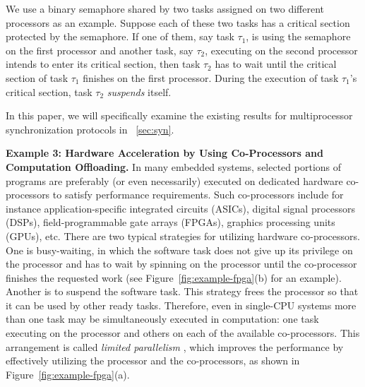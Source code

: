 We use a binary semaphore shared by two tasks assigned on two different processors as an example. Suppose each of these two tasks has a critical section protected by the semaphore. If one of them, say task $\tau_1$, is using the semaphore on the first processor and another task, say $\tau_2$, executing on the second processor intends to enter its critical section, then task $\tau_2$ has to wait until the critical section of task $\tau_1$ finishes on the first processor. During the execution of task $\tau_1$'s critical section, task $\tau_2$ \emph{suspends} itself. 


In this paper, we will specifically examine the existing results for multiprocessor synchronization protocols in \mysectionref{}~\ref{sec:syn}. %

{\bf Example 3: Hardware Acceleration by Using Co-Processors and Computation Offloading.} \hspace{0.1in}
 In many embedded systems, selected portions of programs are preferably (or even necessarily) executed on dedicated hardware co-processors to satisfy performance requirements.  Such co-processors include for instance application-specific integrated circuits (ASICs), digital signal processors (DSPs), field-programmable gate arrays (FPGAs), graphics processing units (GPUs), etc. There are two typical strategies for utilizing hardware co-processors. One is busy-waiting, in which the software task does not give up its privilege on the processor and has to wait by spinning on the processor until the co-processor finishes the requested work (see Figure~\ref{fig:example-fpga}(b) for an example). Another is to suspend the software task. This strategy frees the processor so that it can be used by other ready tasks. Therefore, even in single-CPU systems more than one task may be simultaneously executed in computation: one task executing on the processor and others on each of the available co-processors. This arrangement is called \emph{limited parallelism} \cite{RTAS-AudsleyB04}, which improves the performance by effectively utilizing the processor and the co-processors, as shown in Figure~\ref{fig:example-fpga}(a).

